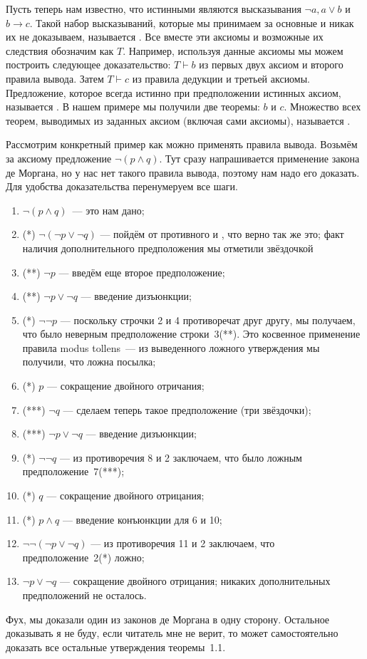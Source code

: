 Пусть теперь нам известно, что истинными являются высказывания $\neg a, a\lor b$ и $b\to c$. Такой набор высказываний, которые мы принимаем за основные и никак их не доказываем, называется . Все вместе эти аксиомы и возможные их следствия обозначим как $T$. Например, используя данные аксиомы мы можем построить следующее доказательство: $T\vdash b$ из первых двух аксиом и второго правила вывода. Затем $T\vdash c$ из правила дедукции и третьей аксиомы. Предложение, которое всегда истинно при предположении истинных аксиом, называется . В нашем примере мы получили две теоремы: $b$ и $c$. Множество всех теорем, выводимых из заданных аксиом (включая сами аксиомы), называется .

\begin{example}
Рассмотрим конкретный пример как можно применять правила вывода. Возьмём за аксиому предложение $\neg (p\land q)$. Тут сразу напрашивается применение закона де Моргана, но у нас нет такого правила вывода, поэтому нам надо его доказать. Для удобства доказательства перенумеруем все шаги.
\begin{enumerate}
\item $\neg (p\land q)$~--- это нам дано;
\item (*) $\neg (\neg p \lor \neg q)$ --- пойдём от противного и , что верно так же это; факт наличия дополнительного предположения мы отметили звёздочкой
\item (**) $\neg p$ --- введём еще второе предположение;
\item (**) $\neg p \lor \neg q$ --- введение  дизъюнкции;
\item (*) $\neg \neg p$ --- поскольку строчки 2 и 4 противоречат друг другу, мы получаем, что было неверным предположение строки~3(**). Это косвенное применение правила modus tollens~--- из выведенного ложного утверждения мы получили, что ложна посылка;
\item (*) $p$ --- сокращение двойного отричания;
\item (***) $\neg q$ --- сделаем теперь такое предположение (три звёздочки);
\item (***) $\neg p \lor \neg q$ --- введение дизъюнкции;
\item (*) $\neg \neg q$ --- из противоречия 8 и 2 заключаем, что было ложным предположение~7(***);
\item (*) $q$ --- сокращение двойного отрицания;
\item (*) $p\land q$ --- введение конъюнкции для 6 и 10;
\item $\neg\neg(\neg p\lor \neg q)$ --- из противоречия 11 и 2 заключаем, что предположение~2(*) ложно;
\item $\neg p\lor \neg q$ --- сокращение двойного отрицания; никаких дополнительных предположений не осталось.
\end{enumerate}
Фух, мы доказали один из законов де Моргана в одну сторону. Остальное доказывать я не буду, если читатель мне не верит, то может самостоятельно доказать все остальные утверждения теоремы~1.1.
\end{example}

